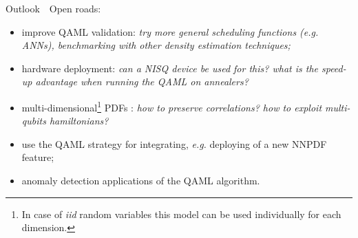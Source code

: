 \documentclass[8pt, xcolor={svgnames}, hyperref={colorlinks, linkcolor=black, citecolor=amethyst, urlcolor=amethyst}]{beamer}
\begin{document}
\begin{frame}{Outlook}
\large
\faArrowCircleRight\,\, Open roads:
\pause
\begin{itemize}
  \item[\faExternalLink] improve QAML validation: \textcolor{amethyst}{\textit{
  try more general scheduling functions (e.g. ANNs), benchmarking with other 
  density estimation techniques;}} 
  \pause
  \item[\faExternalLink] hardware deployment: \textcolor{amethyst}{\textit{can a NISQ device be used for this?
  what is the speed-up advantage when running the QAML on annealers?}}
  \item[\faExternalLink] multi-dimensional\footnote<2->{In case of \textit{iid} 
  random variables this model can be used individually for each dimension.} PDFs
  : \textcolor{amethyst}{\textit{how to preserve correlations?
  how to exploit multi-qubits hamiltonians?}}
  \pause
  \item[\faExternalLink] use the QAML strategy for integrating, \textit{e.g.} 
  deploying of a new NNPDF feature;
  \pause
  \item[\faExternalLink] anomaly detection applications of the QAML algorithm.
\end{itemize}
\end{frame}
\end{document}
